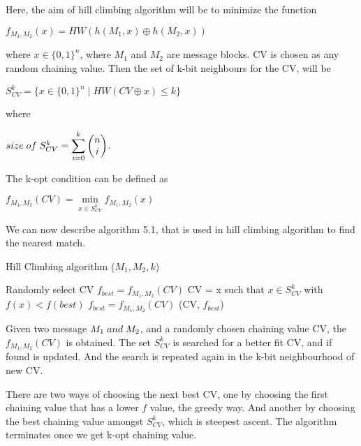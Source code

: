 Here, the aim of hill climbing algorithm will be to minimize the function 
\begin{center}$f_{M_{1}, M_{2}}(x) = HW( h(M_{1}, x) \oplus h(M_{2}, x) )$\end{center}
where $x \in \{0, 1\}^{n}$, where $M_{1}$ and $M_{2}$ are message blocks. CV is chosen as any random chaining value. Then the 
set of k-bit neighbours for the CV, will be 
\begin{center}$S^{k}_{CV} = \{ x \in \{0, 1\}^{n} \mid HW( CV \oplus x ) \leq k \}$\end{center}
where 
\begin{center}$ size \thickspace of \thickspace S^{k}_{CV} = \displaystyle \sum \limits_{i = 0}^{k} \begin{pmatrix} n \\ i \end{pmatrix}$.\end{center}
The k-opt condition can be defined as 
\begin{center}$f_{M_{1}, M_{2}} (CV) =  \min\limits_{x \in S^{k}_{CV}} f_{M_{1}, M_{2}} (x)$\end{center}
We can now describe algorithm 5.1, that is used in hill climbing algorithm to find the nearest match. 

\begin{algorithm}
  \caption{ Hill Climbing algorithm ($M_{1}, M_{2}, k$) \cite{00029}}
  \begin{algorithmic}[1]
    \State Randomly select CV
    \State $f_{best} = f_{M_{1}, M_{2}}(CV)$
    \State {}
    \State CV = x such that $x \in S^{k}_{CV}$ with $f(x) < f(best)$
    \State $f_{best} = f_{M_{1}, M_{2}}(CV)$
    \State \EndWhile
    \State \Return (CV, $f_{best}$)
  \end{algorithmic}
\end{algorithm}

Given two message $M_{1} \thickspace and \thickspace M_{2}$, and a randomly chosen chaining value CV, the $f_{M_{1}, M_{2}}(CV)$
is obtained. The set $S^{k}_{CV}$ is searched for a better fit CV, and if found is updated. And the search is repeated again
in the k-bit neighbourhood of new CV.

There are two ways of choosing the next best CV, one by choosing the first chaining value that has a lower $f$ value, the
greedy way. And another by choosing the best chaining value amongst $S^{k}_{CV}$, which is steepest ascent. The algorithm
terminates once we get k-opt chaining value.

